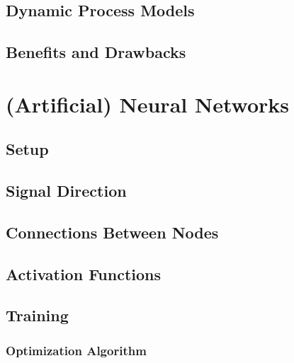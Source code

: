        \subsection{Dynamic Process Models} %

        \subsection{Benefits and Drawbacks} %

    \section{(Artificial) Neural Networks} %

        \subsection{Setup} %

        \subsection{Signal Direction} %

        \subsection{Connections Between Nodes} %

        \subsection{Activation Functions} %

        \subsection{Training} %

            \subsubsection{Optimization Algorithm} %

